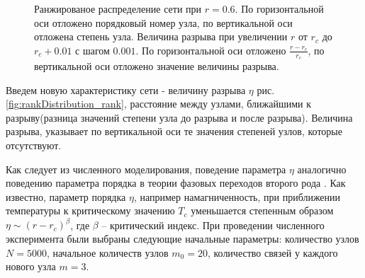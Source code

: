 \documentclass[10pt,aps,pra]{revtex4-1}
\begin{document}
\begin{figure}[H]  

\centering
{}  

\caption{
\label{fig:rankDistribution}
 Ранжированое распределение сети при $r=0.6$. По горизонтальной оси отложено порядковый номер узла, по вертикальной оси отложена степень узла.
 Величина разрыва при увеличении $r$ от $r_c$ до $r_c + 0.01$ с шагом $0.001$. По горизонтальной оси отложено $\frac{r-r_c}{r_c}$, по вертикальной оси отложено значение величины разрыва.
}
\end{figure}


Введем новую характеристику сети - величину разрыва $\eta$ рис. \ref{fig:rankDistribution_rank}, расстояние между узлами, ближайшими к разрыву(разница значений степени узла до разрыва и после разрыва). Величина разрыва, указывает по вертикальной оси те значения степеней узлов, которые отсутствуют. 

Как следует из численного моделирования, поведение параметра $\eta$ аналогично поведению параметра порядка в теории фазовых переходов второго рода \cite{Landau}. Как известно, параметр порядка $\eta$, например намагниченность, при приближении температуры к критическому значению $T_c$ уменьшается степенным образом $\eta \sim (r-r_c)^\beta$, где $\beta$ – критический индекс. 
При проведении численного эксперимента были выбраны следующие начальные параметры: количество узлов $N=5000$, начальное количеств узлов $m_0=20$, количество связей у каждого нового узла $m=3$.
\end{document}
